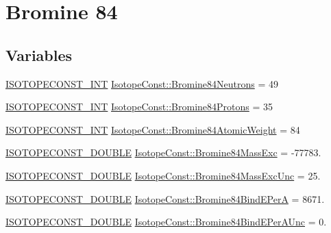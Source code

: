 \hypertarget{group___isotope_const-_bromine-_br84}{}\section{Bromine 84}
\label{group___isotope_const-_bromine-_br84}
\subsection*{Variables}
\begin{DoxyCompactItemize}
\item 
\mbox{\hyperlink{group___isotope_const-_macros_ga5f18360b3e99483a35c32d789e62621c}{I\+S\+O\+T\+O\+P\+E\+C\+O\+N\+S\+T\+\_\+\+I\+NT}} \mbox{\hyperlink{group___isotope_const-_bromine-_br84_gacbec223541142921030c6f8be2b33285}{Isotope\+Const\+::\+Bromine84\+Neutrons}} = 49
\item 
\mbox{\hyperlink{group___isotope_const-_macros_ga5f18360b3e99483a35c32d789e62621c}{I\+S\+O\+T\+O\+P\+E\+C\+O\+N\+S\+T\+\_\+\+I\+NT}} \mbox{\hyperlink{group___isotope_const-_bromine-_br84_ga8e7e385c2941e8da47dcbcff4c143553}{Isotope\+Const\+::\+Bromine84\+Protons}} = 35
\item 
\mbox{\hyperlink{group___isotope_const-_macros_ga5f18360b3e99483a35c32d789e62621c}{I\+S\+O\+T\+O\+P\+E\+C\+O\+N\+S\+T\+\_\+\+I\+NT}} \mbox{\hyperlink{group___isotope_const-_bromine-_br84_ga996ea236ba1b5ea9dcaeb0796415899a}{Isotope\+Const\+::\+Bromine84\+Atomic\+Weight}} = 84
\item 
\mbox{\hyperlink{group___isotope_const-_macros_ga8f45a7272ce02c0b4c65c44636ed719a}{I\+S\+O\+T\+O\+P\+E\+C\+O\+N\+S\+T\+\_\+\+D\+O\+U\+B\+LE}} \mbox{\hyperlink{group___isotope_const-_bromine-_br84_gac5b4b6372d3c3c47b5adaac2a297b659}{Isotope\+Const\+::\+Bromine84\+Mass\+Exc}} = -\/77783.
\item 
\mbox{\hyperlink{group___isotope_const-_macros_ga8f45a7272ce02c0b4c65c44636ed719a}{I\+S\+O\+T\+O\+P\+E\+C\+O\+N\+S\+T\+\_\+\+D\+O\+U\+B\+LE}} \mbox{\hyperlink{group___isotope_const-_bromine-_br84_ga612593ddf60cf0ec2749bdf053463395}{Isotope\+Const\+::\+Bromine84\+Mass\+Exc\+Unc}} = 25.
\item 
\mbox{\hyperlink{group___isotope_const-_macros_ga8f45a7272ce02c0b4c65c44636ed719a}{I\+S\+O\+T\+O\+P\+E\+C\+O\+N\+S\+T\+\_\+\+D\+O\+U\+B\+LE}} \mbox{\hyperlink{group___isotope_const-_bromine-_br84_gacf7a426a7ca6fe61d95479bd251bdfda}{Isotope\+Const\+::\+Bromine84\+Bind\+E\+PerA}} = 8671.
\item 
\mbox{\hyperlink{group___isotope_const-_macros_ga8f45a7272ce02c0b4c65c44636ed719a}{I\+S\+O\+T\+O\+P\+E\+C\+O\+N\+S\+T\+\_\+\+D\+O\+U\+B\+LE}} \mbox{\hyperlink{group___isotope_const-_bromine-_br84_ga1e94842b6724a5cb24f1f62003b4c22c}{Isotope\+Const\+::\+Bromine84\+Bind\+E\+Per\+A\+Unc}} = 0.

\end{DoxyCompactItemize}
